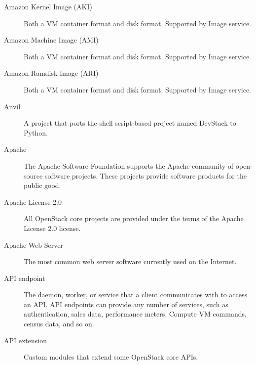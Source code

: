 \documentclass[letterpaper,10pt,english]{sphinxmanual}
\begin{document}
\begin{description}
\item[{Amazon Kernel Image (AKI)}] \leavevmode{}\label{_source/glossary:term-amazon-kernel-image-aki}
Both a VM container format and disk format. Supported by Image
service.

\item[{Amazon Machine Image (AMI)}] \leavevmode{}\label{_source/glossary:term-amazon-machine-image-ami}
Both a VM container format and disk format. Supported by Image
service.

\item[{Amazon Ramdisk Image (ARI)}] \leavevmode{}\label{_source/glossary:term-amazon-ramdisk-image-ari}
Both a VM container format and disk format. Supported by Image
service.

\item[{Anvil}] \leavevmode{}\label{_source/glossary:term-anvil}
A project that ports the shell script-based project named
DevStack to Python.

\item[{Apache}] \leavevmode{}\label{_source/glossary:term-apache}
The Apache Software Foundation supports the Apache community of
open-source software projects. These projects provide software
products for the public good.

\item[{Apache License 2.0}] \leavevmode{}\label{_source/glossary:term-apache-license-2-0}
All OpenStack core projects are provided under the terms of the
Apache License 2.0 license.

\item[{Apache Web Server}] \leavevmode{}\label{_source/glossary:term-apache-web-server}
The most common web server software currently used on the
Internet.

\item[{API endpoint}] \leavevmode{}\label{_source/glossary:term-api-endpoint}
The daemon, worker, or service that a client communicates with
to access an API. API endpoints can provide any number of services,
such as authentication, sales data, performance meters, Compute VM
commands, census data, and so on.

\item[{API extension}] \leavevmode{}\label{_source/glossary:term-api-extension}
Custom modules that extend some OpenStack core APIs.


\end{description}
\end{document}
